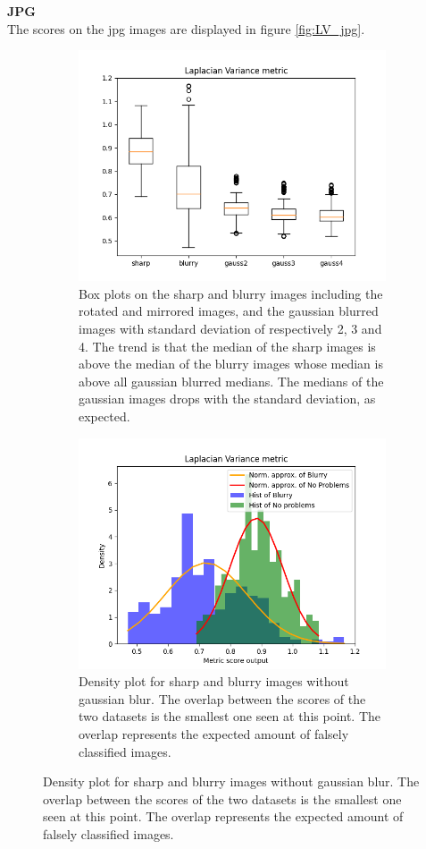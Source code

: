 \textbf{JPG}\\
The scores on the jpg images are displayed in figure \ref{fig:LV_jpg}.
\begin{figure}[H]
    \centering
    \begin{subfigure}[t]{0.48\textwidth}
        \includegraphics[width=\textwidth]{Figures/lv/output_boxplot_lv_jpg.png}
        \caption{Box plots on the sharp and blurry images including the rotated and mirrored images, and the gaussian blurred images with standard deviation of respectively 2, 3 and 4. The trend is that the median of the sharp images is above the median of the blurry images whose median is above all gaussian blurred medians. The medians of the gaussian images drops with the standard deviation, as expected.}
        \label{fig:LV_roc}
    \end{subfigure}\hspace{1em}
    \begin{subfigure}[t]{0.48\textwidth}
	    \includegraphics[width=\textwidth]{Figures/lv/output_dens_lv_jpg.png}
	    \caption{Density plot for sharp and blurry images without gaussian blur. The overlap between the scores of the two datasets is the smallest one seen at this point. The overlap represents the expected amount of falsely classified images.}
	    \label{fig:LV_dens_jpg}
    \end{subfigure}\hspace{1em}


\end{figure}

